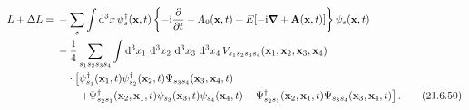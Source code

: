 \begin{align}
L+\Delta L
={}&-\sum_s\int \mathop{}\!\mathrm{d}^3x\,
\psi_s^\dagger(\mathbf x,t)
\left\{
-\mathrm{i}\frac{\partial}{\partial t}-A_0(\mathbf x,t)
+E[-\mathrm{i}\boldsymbol\nabla+\mathbf A(\mathbf x,t)]
\right\}\psi_s(\mathbf x,t)
\notag\\
&-\frac14\sum_{s_1s_2s_3s_4}
\int \mathop{}\!\mathrm{d}^3x_1\,\mathop{}\!\mathrm{d}^3x_2\,\mathop{}\!\mathrm{d}^3x_3\,\mathop{}\!\mathrm{d}^3x_4\,
V_{s_1s_2s_3s_4}(\mathbf x_1,\mathbf x_2,\mathbf x_3,\mathbf x_4)
\notag\\
&\quad\cdot
\left[
\psi^\dagger_{s_1}(\mathbf x_1,t)
\psi^\dagger_{s_2}(\mathbf x_2,t)
\Psi_{s_3s_4}(\mathbf x_3,\mathbf x_4,t)
\right.
\notag\\
&\qquad\left.
+\Psi^\dagger_{s_2s_1}(\mathbf x_2,\mathbf x_1,t)
\psi_{s_3}(\mathbf x_3,t)
\psi_{s_4}(\mathbf x_4,t)
-\Psi^\dagger_{s_2s_1}(\mathbf x_2,\mathbf x_1,t)
\Psi_{s_3s_4}(\mathbf x_3,\mathbf x_4,t)
\right].
\tag{21.6.50}\label{eq:21.6.50}
\end{align}

